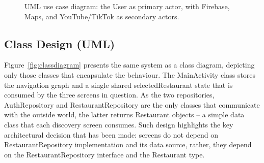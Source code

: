 \documentclass[12pt, a4paper]{article}
\begin{document}
\begin{figure}[H]
{%
}
\caption[UML use case diagram for Spot To Go.]{UML use case diagram: the User as primary actor, with Firebase, Maps, and YouTube/TikTok as secondary actors.}
\label{fig:usecase}
\end{figure}

\subsection{Class Design (UML)}

Figure~\ref{fig:classdiagram} presents the same system as a class diagram, depicting only those classes that encapsulate the behaviour. The MainActivity class stores the navigation graph and a single shared selectedRestaurant state that is consumed by the three screens in question. As the two repositories, AuthRepository and RestaurantRepository are the only classes that communicate with the outside world, the latter returns Restaurant objects -- a simple data class that each discovery screen consumes. Such design highlights the key architectural decision that has been made: screens do not depend on RestaurantRepository implementation and its data source, rather, they depend on the RestaurantRepository interface and the Restaurant type.
\end{document}
